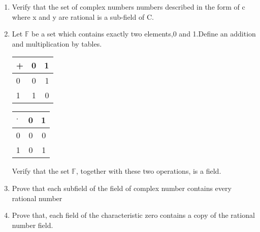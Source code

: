 \renewcommand{\theequation}{\theenumi}
\renewcommand{\thefigure}{\theenumi}
\begin{enumerate}[label=\thesubsection.\arabic*.,ref=\thesubsection.\theenumi]
%
\item  Verify that the set of complex numbers numbers described in the form of c where x and y are rational is a sub-field of C.
\\
\solution


\item Let $\mathbb{F}$ be a set which contains exactly two elements,0 and 1.Define an addition and multiplication by tables.
\begin{table}[h!]
  \begin{center}
    \label{eq:solutions/1/1/5/tab:table1}
    \begin{tabular}{l|c|r}
      + & 0 & 1 \\
      \hline
      0 & 0 & 1\\
      1 & 1 & 0
    \end{tabular}
  \end{center}
\end{table}
\begin{table}[h!]
  \begin{center}
    \label{eq:solutions/1/1/5/tab:table2}
    \begin{tabular}{l|c|r}
      $\cdot$ & 0 & 1 \\
      \hline
      0 & 0 & 0\\
      1 & 0 & 1
    \end{tabular}
  \end{center}
\end{table}
  Verify that the set $\mathbb{F}$, together with these two operations, is a field.
%
\\
\solution

\item Prove that each subfield of the field of complex number contains every rational number
\\
\solution

%
\item Prove that, each field of the characteristic zero contains a copy of the rational number field.
\\
\solution

\end{enumerate}


